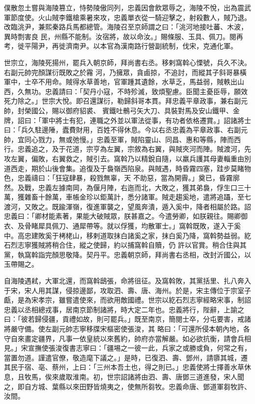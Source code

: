 \begin{pinyinscope}
 僕散忽土嘗與海陵篡立，恃勢陵傲同列，忠義因會飲眾辱之，海陵不悅，出為震武軍節度使。火山賊李鐵槍乘暑來攻，忠義單衣從一騎迎擊之，射殺數人，賊乃退。改臨洮尹，兼熙秦路兵馬都總管。海陵召至京師謂之曰：「洮河地接吐蕃、木波，異時剽害良
 民，州縣不能制。汝宿將，故以命汝。」賜條服、玉具、佩刀。閱再考，徙平陽尹，再徙濟南尹。以本官為漢南路行營副統制，伐宋，克通化軍。


世宗立，海陵死揚州，罷兵入朝京師，拜尚書右丞。移剌窩斡心慄號，兵久不決。右副元帥完顏謀衍既敗之於霿
 河，乃擁眾，貪鹵掠，不追討，而縱其子斜哥暴橫軍中，士卒不用命。賊得水草善地，官軍踵其遺餘，水草乏，馬益弱，賊軼出山西，久無功。忠義請曰：「契丹小寇，不時殄滅，致煩聖慮。臣聞主憂臣辱，願效死力除之。」世宗大悅。即召還謀衍，勒歸斜哥本貫。拜忠義平章政事，兼右副元帥，封榮國公，賜以御府貂裘、
 賓鐵吐鶻弓矢大刀、具裝對馬及安山鐵甲、金牌，詔曰：「軍中將士有犯，連職之外並以軍法從事，有功者依格遷賞。」詔諸將士曰：「兵久駐邊陲，蠹費財用，百姓不得休息。今以右丞忠義為平章政事、右副元帥，宜同心戮力，無或弛慢。」忠義至軍，賊陷靈山、同昌、惠和等縣，陣而西行。忠義追之，及于花道，宗亨為左翼，宗敘為右翼，與賊夾河而陣。賊渡河，先攻左翼，偏敗，右翼救之，賊引去。窩斡乃以精銳自隨，以羸兵護其母妻輜重由別道西走，期於山後會集。追復及于裊嶺西陷泉。與賊遇，時昏霧四塞，跬步莫睹物色，忠義禱曰：「狂寇肆暴，殺戮無辜，天
 不助惡，當為開霽。」奠已，昏霧廓然。及戰，忠義左據南岡，為偃月陣，右迤而北，大敗之，獲其弟裊，俘生口三十萬，獲雜畜十餘萬，車帳金珍以鉅萬計，悉分諸軍。賊走趨奚地，遣將追躡，至七渡河，又敗之。既踰渾嶺，復進軍襲之，望風奔潰，遁入奚中，降者相屬於路。詔忠義曰：「卿材能素著，果能大破賊眾，朕甚嘉之。今遣勞卿，如朕親往。賜卿御衣、及骨睹犀具佩刀、通犀帶等。就以俘獲，均散軍士。」窩斡既敗，遂入于奚中。高忠建敗奚于栲栳山，移剌道取抹白諸奚之家，抹白奚乃降，窩斡勢益弱。紇石烈志寧獲賊將稍合住，縱之使歸，約以捕窩斡自贖，仍
 許以官賞。稍合住與其黨，執窩斡詣完顏思敬降。契丹平。忠義朝京師，拜尚書右丞相，改封沂國公，以玉帶賜之。



 自海陵遇弒，大軍北還，而窩斡鴟張，命將徂征。及窩斡敗，其黨括里、扎八奔入于宋，宋人用其謀，侵掠邊鄙，攻取泗、壽、唐、海州。於是，宋主傳位于宗室子甗，是為宋孝宗，雖嘗遣使來，而欲用敵國禮。世宗以紇石烈志寧經略宋事，制詔忠義以丞相總戎事，居南京節制諸將，時大定二年也。忠義將行，陛辭，上諭之曰：「彼若歸侵疆，貢禮如故，則可罷兵。」既至南京，簡閱士卒，分屯要害，戒諸將嚴守備。使左副元帥志寧移牒宋樞密使張浚，其
 略曰：「可還所侵本朝內地，各守自來畫定疆界，凡事一依皇統以來舊約，帥府亦當解嚴。如必欲抗衡，請會兵相見。」宋宣撫使張浚復書志寧曰：「疆埸之一彼一此，兵家之或勝或負，何常之有，當置勿道。謹遣官僚，敬造麾下議之。」是時，已復泗、壽、鄧州，請隳其城，遷其民于宿、亳、蔡州，上曰：「三州本吾土也，得之則已。」忠義使將士擇善水草休息，且牧馬，俟來歲取淮南。初，世宗詔諸將由泗、壽、唐鄧三道進發，宋人聞之，即自方城、葉縣以來田野皆燒夷之，使無所芻牧。忠義命唐、鄧道軍芻牧許、汝間。




\end{pinyinscope}
